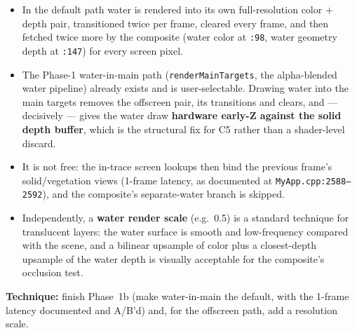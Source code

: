 \documentclass[11pt,a4paper]{article}
\begin{document}
\begin{itemize}
    \item In the default path water is rendered into its own full-resolution color $+$ depth pair, transitioned twice
    per frame, cleared every frame, and then fetched twice more by the composite (water color at \texttt{:98}, water
    geometry depth at \texttt{:147}) for every screen pixel.
    \item The Phase-1 water-in-main path (\texttt{renderMainTargets}, the alpha-blended water pipeline) already exists
    and is user-selectable. Drawing water into the main targets removes the offscreen pair, its transitions and clears,
    and --- decisively --- gives the water draw \textbf{hardware early-Z against the solid depth buffer}, which is the
    structural fix for C5 rather than a shader-level discard.
    \item It is not free: the in-trace screen lookups then bind the previous frame's solid/vegetation views (1-frame
    latency, as documented at \texttt{MyApp.cpp:2588--2592}), and the composite's separate-water branch is skipped.
    \item Independently, a \textbf{water render scale} (e.g.\ 0.5) is a standard technique for translucent layers: the
    water surface is smooth and low-frequency compared with the scene, and a bilinear upsample of color plus a
    closest-depth upsample of the water depth is visually acceptable for the composite's occlusion test.
\end{itemize}

\textbf{Technique:} finish Phase~1b (make water-in-main the default, with the 1-frame latency documented and A/B'd) and,
for the offscreen path, add a resolution scale.
\end{document}
